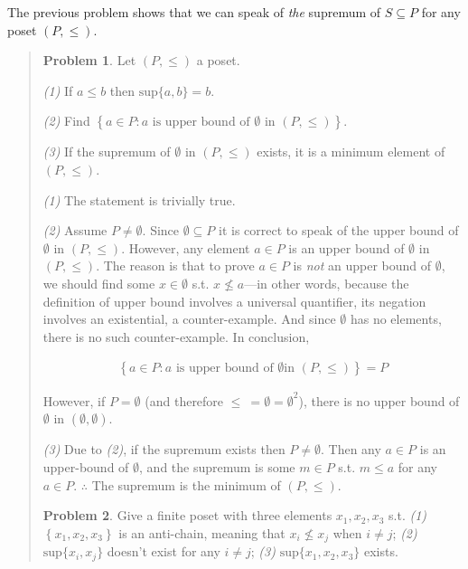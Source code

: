 \documentclass[a4paper, 12pt]{article}
\theoremstyle{definition}
\newtheorem{problem}{Problem}
\theoremstyle{definition}
\theoremstyle{definition}
\begin{document}
The previous problem shows that we can speak of \textit{the} supremum of $S
\subseteq P$ for any poset $(P, \leq) $.


\small
\begin{quote}

\begin{problem}
    Let $(P, \leq) $ a poset. 

    \textit{(1)} If $a \leq b$ then $\text{sup}\{a, b\}
    = b$. 

    \textit{(2)} Find $\left\{ a \in P : a \text{ is upper bound of }
    \emptyset \text{ in } (P, \leq)  \right\} $. 

    \textit{(3)} If the supremum of
    $\emptyset$ in $(P, \leq) $ exists, it is a minimum element of $(P, \leq) $.
\end{problem}

\textit{(1)} The statement is trivially true. 

\textit{(2)} Assume $P \neq \emptyset$. Since $\emptyset \subseteq P$ it is
correct to speak of the upper bound of $\emptyset$ in $(P, \leq) $. However, any
element $a \in P$ is an upper bound of $\emptyset$ in $(P, \leq) $. The reason
is that to prove $a \in P$ is \textit{not} an upper bound of $\emptyset$, we
should find some $x \in \emptyset$ s.t. $x \not\leq a$---in other words, because
the definition of upper bound involves a universal quantifier, its negation
involves an existential, a counter-example. And since $\emptyset$ has no
elements, there is no such counter-example. In conclusion, 

\begin{align*} \left\{ a \in  P : a \text{ is upper bound of } \emptyset \text{
in } (P, \leq)  \right\} = P \end{align*}

However, if $P = \emptyset$ (and therefore $\leq ~= \emptyset = \emptyset^2$), there is no
upper bound of $\emptyset$ in $(\emptyset, \emptyset)$.

\textit{(3)}  Due to \textit{(2)}, if the supremum exists then $P \neq \emptyset$.
Then any $a \in P$ is an upper-bound of $\emptyset$,
and the supremum is some $m \in P$ s.t. $m \leq a$ for any $a \in P$. 
$\therefore $ The supremum is the minimum of $(P, \leq)$.

\begin{problem}
    Give a finite poset with three elements $x_1, x_2, x_3$ s.t. \textit{(1)}
    $\left\{ x_1, x_2, x_3 \right\} $ is an anti-chain, meaning that $x_i
    \not\leq x_j$ when $i \neq j$; \textit{(2)} $\text{sup}\{x_i, x_j\} $
    doesn't exist for any $i \neq j$; \textit{(3)} $\text{sup}\{x_1, x_2,x_3\} $
    exists.
\end{problem}


\end{quote}
\end{document}

